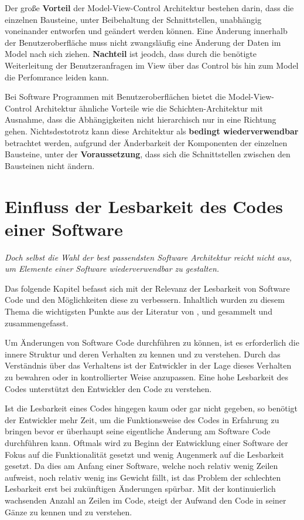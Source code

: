 \documentclass[utf8,biblatex]{lni}
\begin{document}
Der große \textbf{Vorteil} der Model-View-Control Architektur bestehen darin, dass die einzelnen Bausteine, unter Beibehaltung der Schnittstellen, unabhängig voneinander entworfen und geändert werden können. Eine Änderung innerhalb der Benutzeroberfläche muss nicht zwangsläufig eine Änderung der Daten im Model nach sich ziehen. \textbf{Nachteil} ist jeodch, dass durch die benötigte Weiterleitung der Benutzeranfragen im View über das Control bis hin zum Model die Perfomrance leiden kann.

Bei Software Programmen mit Benutzeroberflächen bietet die Model-View-Control Architektur ähnliche Vorteile wie die Schichten-Architektur mit Ausnahme, dass die Abhängigkeiten nicht hierarchisch nur in eine Richtung gehen. Nichtsdestotrotz kann diese Architektur als \textbf{bedingt wiederverwendbar} betrachtet werden, aufgrund der Änderbarkeit der Komponenten der einzelnen Bausteine, unter der \textbf{Voraussetzung}, dass sich die Schnittstellen zwischen den Bausteinen nicht ändern.

\section{Einfluss der Lesbarkeit des Codes einer Software}

\textsl{Doch selbst die Wahl der best passendsten Software Architektur reicht nicht aus, um Elemente einer Software wiederverwendbar zu gestalten.}

Das folgende Kapitel befasst sich mit der Relevanz der Lesbarkeit von Software Code und den Möglichkeiten diese zu verbessern. Inhaltlich wurden zu diesem Thema die wichtigsten Punkte aus der Literatur von \citet{Kapil.2019}, \citet{Martin.2009} und \citet{Roth.2021} gesammelt und zusammengefasst.


Um Änderungen von Software Code durchführen zu können, ist es erforderlich die innere Struktur und deren Verhalten zu kennen und zu verstehen. Durch das Verständnis über das Verhaltens ist der Entwickler in der Lage dieses Verhalten zu bewahren oder in kontrollierter Weise anzupassen. Eine hohe Lesbarkeit des Codes unterstützt den Entwickler den Code zu verstehen.

Ist die Lesbarkeit eines Codes hingegen kaum oder gar nicht gegeben, so benötigt der Entwickler mehr Zeit, um die Funktionsweise des Codes in Erfahrung zu bringen bevor er überhaupt seine eigentliche Änderung am Software Code durchführen kann. Oftmals wird zu Beginn der Entwicklung einer Software der Fokus auf die Funktionalität gesetzt und wenig Augenmerk auf die Lesbarkeit gesetzt. Da dies am Anfang einer Software, welche noch relativ wenig Zeilen aufweist, noch relativ wenig ins Gewicht fällt, ist das Problem der schlechten Lesbarkeit erst bei zukünftigen Änderungen spürbar. Mit der kontinuierlich wachsenden Anzahl an Zeilen im Code, steigt der Aufwand den Code in seiner Gänze zu kennen und zu verstehen.
\end{document}
